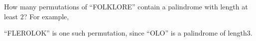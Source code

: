 How many permutations of ``FOLKLORE'' contain a palindrome with length at least $2$? For example,

``FLEROLOK'' is one such permutation, since ``OLO'' is a palindrome of length$ 3$.
